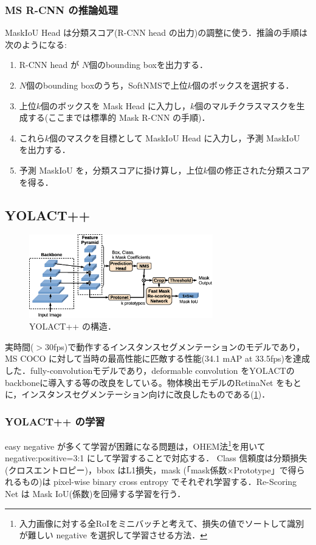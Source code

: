 \documentclass[originalpaper]{jsaiart}     %
\begin{document}
\subsubsection{MS R-CNN の推論処理}
MaskIoU Head は分類スコア(R-CNN head の出力)の調整に使う．推論の手順は次のようになる:
\begin{enumerate}
    \item R-CNN head が $N$個のbounding boxを出力する．
    \item $N$個のbounding boxのうち，SoftNMS\cite{BSCD17}で上位$k$個のボックスを選択する．
    \item 上位$k$個のボックスを Mask Head に入力し，$k$個のマルチクラスマスクを生成する(ここまでは標準的 Mask R-CNN の手順)．
    \item これら$k$個のマスクを目標として MaskIoU Head に入力し，予測 MaskIoU を出力する．
    \item 予測 MaskIoU を，分類スコアに掛け算し，上位$k$個の修正された分類スコアを得る．
\end{enumerate}

\subsection{YOLACT++}
\begin{figure}[tb]
    \begin{center}
        \includegraphics[width=8cm,clip]{fig/archi_YOLACT++.eps}
    \end{center}
    \caption{ YOLACT++ の構造．}
    \label{fig:archi_yolactpp}
\end{figure}  
実時間(${>}$30fps)で動作するインスタンスセグメンテーションのモデルであり，MS COCO に対して当時の最高性能に匹敵する性能(34.1 mAP at 33.5fps)を達成した\cite{BZXL20}．fully-convolutionモデルであり，deformable convolution をYOLACT\cite{BZXL19}のbackboneに導入する等の改良をしている。物体検出モデルのRetinaNet\cite{LGGHD17} をもとに，インスタンスセグメンテーション向けに改良したものである(\ref{fig:archi_yolactpp})．
\subsubsection{YOLACT++ の学習}
easy negative が多くて学習が困難になる問題は，OHEM法\footnote{入力画像に対する全RoIをミニバッチと考えて、損失の値でソートして識別が難しい negative を選択して学習させる方法．}を用いて negative:positive=3:1 にして学習することで対応する．
Class 信頼度は分類損失(クロスエントロピー)，bbox はL1損失，mask (「mask係数×Prototype」で得られるもの)は pixel-wise binary cross entropy でそれぞれ学習する．Re-Scoring Net は Mask IoU(係数)を回帰する学習を行う．
\end{document}
